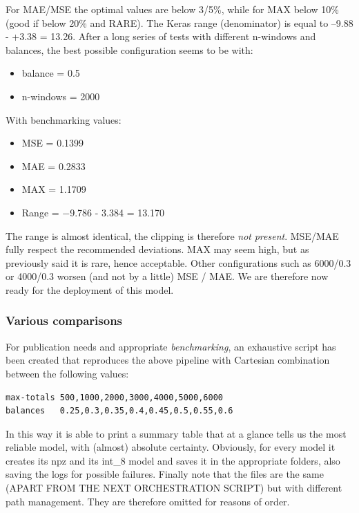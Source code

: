 For MAE/MSE the optimal values are below 3/5\%, while for MAX below 10\% (good if below 20\% and RARE). The Keras range (denominator) is equal to –9.88 - +3.38 = 13.26.
After a long series of tests with different n-windows and balances, the best possible configuration seems to be with:

\begin{itemize}
    \item balance = 0.5
    \item n-windows = 2000
\end{itemize}

With benchmarking values:

\begin{itemize}
    \item MSE = 0.1399
    \item MAE = 0.2833
    \item MAX = 1.1709
    \item Range = −9.786 - 3.384 = 13.170
\end{itemize}

The range is almost identical, the clipping is therefore \textit{not} \textit{present}. MSE/MAE fully respect the recommended deviations. MAX may seem high, but as previously said it is rare, hence acceptable. Other configurations such as 6000/0.3 or 4000/0.3 worsen (and not by a little) MSE / MAE.
We are therefore now ready for the deployment of this model.

\subsubsection{Various comparisons}
For publication needs and appropriate \textit{benchmarking}, an exhaustive script has been created that reproduces the above pipeline with Cartesian combination between the following values:

\begin{verbatim}
max-totals 500,1000,2000,3000,4000,5000,6000
balances   0.25,0.3,0.35,0.4,0.45,0.5,0.55,0.6
\end{verbatim}

In this way it is able to print a summary table that at a glance tells us the most reliable model, with (almost) absolute certainty. Obviously, for every model it creates its npz and its int\_8 model and saves it in the appropriate folders, also saving the logs for possible failures. Finally note that the files are the same (APART FROM THE NEXT ORCHESTRATION SCRIPT) but with different path management. They are therefore omitted for reasons of order.

